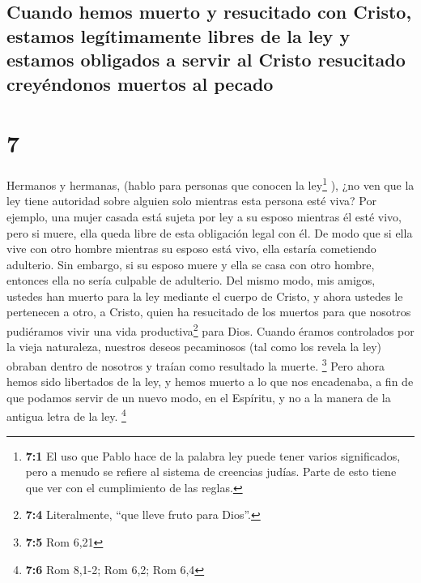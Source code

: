 \hypertarget{cuando-hemos-muerto-y-resucitado-con-cristo-estamos-leguxedtimamente-libres-de-la-ley-y-estamos-obligados-a-servir-al-cristo-resucitado-creyuxe9ndonos-muertos-al-pecado}{%
\subsection{Cuando hemos muerto y resucitado con Cristo, estamos
legítimamente libres de la ley y estamos obligados a servir al Cristo
resucitado creyéndonos muertos al
pecado}\label{cuando-hemos-muerto-y-resucitado-con-cristo-estamos-leguxedtimamente-libres-de-la-ley-y-estamos-obligados-a-servir-al-cristo-resucitado-creyuxe9ndonos-muertos-al-pecado}}

\hypertarget{section-6}{%
\section{7}\label{section-6}}

 Hermanos y hermanas, (hablo para personas que conocen la
ley\footnote{\textbf{7:1} El uso que Pablo hace de la palabra ley puede
  tener varios significados, pero a menudo se refiere al sistema de
  creencias judías. Parte de esto tiene que ver con el cumplimiento de
  las reglas.} ), ¿no ven que la ley tiene autoridad sobre alguien solo
mientras esta persona esté viva?  Por ejemplo, una mujer
casada está sujeta por ley a su esposo mientras él esté vivo, pero si
muere, ella queda libre de esta obligación legal con él. 
De modo que si ella vive con otro hombre mientras su esposo está vivo,
ella estaría cometiendo adulterio. Sin embargo, si su esposo muere y
ella se casa con otro hombre, entonces ella no sería culpable de
adulterio.  Del mismo modo, mis amigos, ustedes han muerto
para la ley mediante el cuerpo de Cristo, y ahora ustedes le pertenecen
a otro, a Cristo, quien ha resucitado de los muertos para que nosotros
pudiéramos vivir una vida productiva\footnote{\textbf{7:4} Literalmente,
  ``que lleve fruto para Dios''.} para Dios.  Cuando
éramos controlados por la vieja naturaleza, nuestros deseos pecaminosos
(tal como los revela la ley) obraban dentro de nosotros y traían como
resultado la muerte. \footnote{\textbf{7:5} Rom 6,21} 
Pero ahora hemos sido libertados de la ley, y hemos muerto a lo que nos
encadenaba, a fin de que podamos servir de un nuevo modo, en el
Espíritu, y no a la manera de la antigua letra de la ley. \footnote{\textbf{7:6}
  Rom 8,1-2; Rom 6,2; Rom 6,4}

